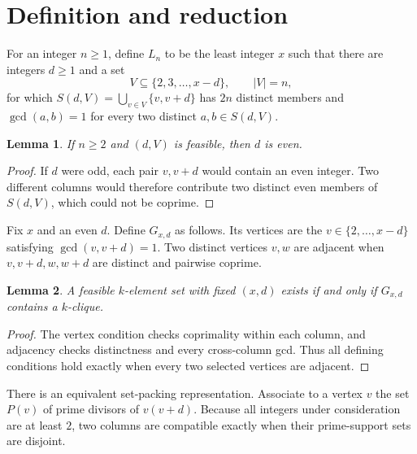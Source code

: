\documentclass[11pt]{article}
\newtheorem{lemma}{Lemma}
\begin{document}
\section{Definition and reduction}
For an integer $n\ge1$, define $L_n$ to be the least integer $x$ such that
there are integers $d\ge1$ and a set
\[V\subseteq\{2,3,\ldots,x-d\},\qquad |V|=n,\]
for which $S(d,V)=\bigcup_{v\in V}\{v,v+d\}$ has $2n$ distinct members and
$\gcd(a,b)=1$ for every two distinct $a,b\in S(d,V)$.
\begin{lemma}\label{lem:parity}
If $n\ge2$ and $(d,V)$ is feasible, then $d$ is even.
\end{lemma}
\begin{proof}
If $d$ were odd, each pair $v,v+d$ would contain an even integer.  Two
different columns would therefore contribute two distinct even members of
$S(d,V)$, which could not be coprime.
\end{proof}
Fix $x$ and an even $d$.  Define $G_{x,d}$ as follows.  Its vertices are the
$v\in\{2,\ldots,x-d\}$ satisfying $\gcd(v,v+d)=1$.  Two distinct vertices
$v,w$ are adjacent when $v,v+d,w,w+d$ are distinct and pairwise coprime.
\begin{lemma}\label{lem:equiv}
A feasible $k$-element set with fixed $(x,d)$ exists if and only if
$G_{x,d}$ contains a $k$-clique.
\end{lemma}
\begin{proof}
The vertex condition checks coprimality within each column, and adjacency
checks distinctness and every cross-column gcd.  Thus all defining conditions
hold exactly when every two selected vertices are adjacent.
\end{proof}
There is an equivalent set-packing representation.  Associate to a vertex
$v$ the set $P(v)$ of prime divisors of $v(v+d)$.  Because all integers under
consideration are at least $2$, two columns are compatible exactly when their
prime-support sets are disjoint.
\end{document}
